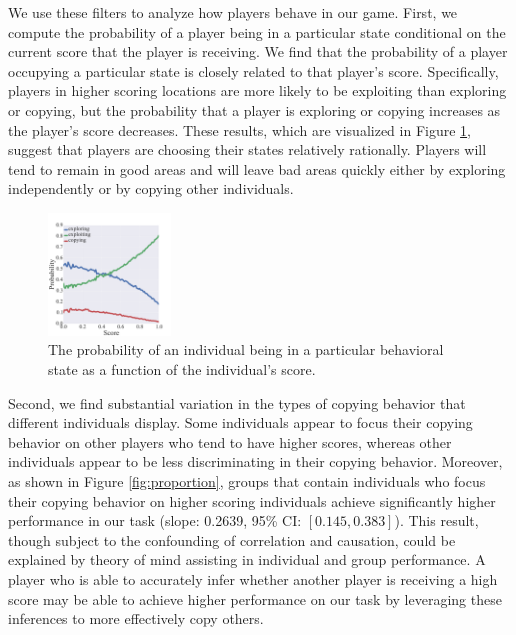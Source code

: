 \documentclass[12pt,letterpaper]{article}
\begin{document}
We use these filters to analyze how players behave in our game.
First, we compute the probability of a player being in a particular
state conditional on the current score that the player is receiving.
We find that the probability of a player occupying a particular state
is closely related to that player's score.  Specifically, players in
higher scoring locations are more likely to be exploiting than
exploring or copying, but the probability that a player is exploring
or copying increases as the player's score decreases.  These results,
which are visualized in Figure \ref{fig:states}, suggest that players
are choosing their states relatively rationally.  Players will tend to
remain in good areas and will leave bad areas quickly either by
exploring independently or by copying other individuals.

\begin{figure}
  \centering
  \includegraphics[width=0.29\textwidth]{./figures/states}
  \caption{The probability of an individual being in a particular
    behavioral state as a function of the individual's score.}
  \label{fig:states}
\end{figure}

Second, we find substantial variation in the types of copying behavior
that different individuals display.  Some individuals appear to focus
their copying behavior on other players who tend to have higher
scores, whereas other individuals appear to be less discriminating in
their copying behavior.  Moreover, as shown in Figure
\ref{fig:proportion}, groups that contain individuals who focus their
copying behavior on higher scoring individuals achieve significantly
higher performance in our task (slope: 0.2639, 95\% CI: $[0.145,
  0.383]$).  This result, though subject to the confounding of
correlation and causation, could be explained by theory of mind
assisting in individual and group performance.  A player who is able
to accurately infer whether another player is receiving a high score
may be able to achieve higher performance on our task by leveraging
these inferences to more effectively copy others.
\end{document}

